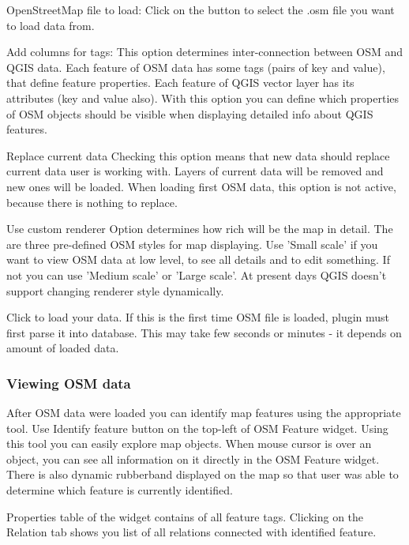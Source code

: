 \begin{description}
\item OpenStreetMap file to load: Click on the button to select the .osm file you want to load data from.
\item Add columns for tags: This option determines inter-connection between OSM and QGIS data. Each
feature of OSM data has some tags (pairs of key and value), that define
feature properties. Each feature of QGIS vector layer has its attributes (key
and value also). With this option you can define which properties of OSM
objects should be visible when displaying detailed info about QGIS features.
\item Replace current data
Checking this option means that new data should replace current data user is
working with. Layers of current data will be removed and new ones will be
loaded. When loading first OSM data, this option is not active, because there
is nothing to replace.
\item Use custom renderer
Option determines how rich will be the map in detail. The are three
pre-defined OSM styles for map displaying. Use 'Small scale' if you want to
view OSM data at low level, to see all details and to edit something. If not
you can use 'Medium scale' or 'Large scale'. At present days QGIS doesn't
support changing renderer style dynamically.
\end{description}

Click  to load your data. If this is the first time OSM 
file is loaded, plugin must first parse it into database.
This may take few seconds or minutes - it depends on amount of loaded data.

\subsubsection{Viewing OSM data}

After OSM data were loaded you can identify map features using the
appropriate tool. Use Identify feature button on the top-left of OSM
Feature widget. Using this tool you can easily explore map objects.
When mouse cursor is over an object, you can see all information on it
directly in the OSM Feature widget. There is also dynamic rubberband
displayed on the map so that user was able to determine which feature is
currently identified.

Properties table of the widget contains of all feature tags.
Clicking on the Relation tab shows you list of all relations connected with
identified feature.

